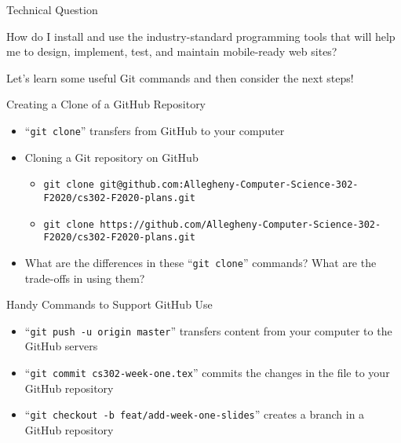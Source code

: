 \documentclass[14pt,aspectratio=169]{beamer}
\begin{document}
%
\begin{frame}{Technical Question}
  \hspace*{.25in}
  \begin{minipage}{4.5in}
    \begin{center}
      {\large How do I install and use the industry-standard programming tools
        that will help me to design, implement, test, and maintain mobile-ready web
      sites?}
    \end{center}
  \end{minipage}
  \vspace{3ex}
  \begin{center}
    \small Let's learn some useful Git commands and then consider the next steps!
  \end{center}
\end{frame}

%
\begin{frame}{Creating a Clone of a GitHub Repository}
  \setlength{\leftmarginii}{0.5cm}
  \begin{itemize}
    \item ``{\tt git clone}'' transfers from GitHub to your computer
    \item Cloning a Git repository on GitHub
      {\tiny
        \begin{itemize}
          \item {\tt git clone git@github.com:Allegheny-Computer-Science-302-F2020/cs302-F2020-plans.git}
          \item {\tt git clone https://github.com/Allegheny-Computer-Science-302-F2020/cs302-F2020-plans.git}
        \end{itemize}
      }
    \item What are the differences in these ``{\tt git clone}'' commands? What are the trade-offs in using them?
  \end{itemize}
\end{frame}

%
\begin{frame}{Handy Commands to Support GitHub Use}
  \begin{itemize}
    \item ``{\tt git push -u origin master}'' transfers content from your computer
      to the GitHub servers
    \item ``{\tt git commit cs302-week-one.tex}'' commits the changes in the
      file to your GitHub repository
    \item ``{\tt git checkout -b feat/add-week-one-slides}'' creates a branch in
      a GitHub repository
  \end{itemize}
\end{frame}
\end{document}
